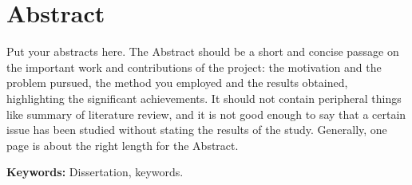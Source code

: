\newpage

\chapter*{\centering Abstract}

\begin{spacing}{1.5}
\setlength{\parskip}{0.3in}


Put your abstracts here. The Abstract should be a short and concise passage on the important work and contributions of the project: the motivation and the problem pursued, the method you employed and the results obtained, highlighting the significant achievements. It should not contain peripheral things like summary of literature review, and it is not good enough to say that a certain issue has been studied without stating the results of the study. Generally, one page is about the right length for the Abstract.

\par
\textbf{Keywords:} Dissertation, keywords.
\end{spacing}
\newpage

